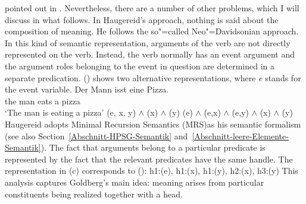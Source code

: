 \begin{exe}
\begin{xlist}[iv.]
\begin{exe}
\begin{xlist}[iv.]
pointed out in .
Nevertheless, there are a number of other problems, which I will discuss in what follows.
In Haugereid's approach, nothing is said about the composition of meaning. He follows the so"=called Neo"=Davidsonian approach.
In this kind of semantic representation, arguments of the verb are not directly represented on the verb.
Instead, the verb normally has an event argument and the argument roles belonging to the event in question are determined in a separate predication.
() shows two alternative representations, where \emph{e} stands for the event variable.
\eal
\ex 
\gll Der Mann isst eine Pizza.\\
	 the man eats a pizza\\
\glt `The man is eating a pizza'
\ex {}(e, x, y) $\wedge$ (x) $\wedge$ (y)
\ex {}(e) $\wedge$ (e,x) $\wedge$ (e,y) $\wedge$ (x) $\wedge$ (y)
\zl
Haugereid adopts Minimal Recursion Semantics (MRS)\indexmrs as his semantic formalism (see also Section~\ref{Abschnitt-HPSG-Semantik} and~\ref{Abschnitt-leere-Elemente-Semantik}). 
The fact that arguments belong to a particular predicate is represented by the fact that the relevant predicates have the same handle. The representation in (c) corresponds
to ():
\ea
h1:(e), h1:(x), h1:(y), h2:(x), h3:(y)
\z
This analysis captures Goldberg's main idea: meaning arises from particular constituents being realized together with a head.


\end{xlist}
\end{exe}
\end{xlist}
\end{exe}
